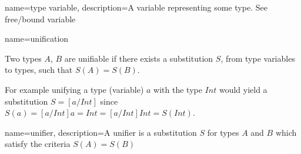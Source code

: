 { name={type variable},
  description={A variable representing some type. See free/bound variable}
}

{ name={unification} }
{Two types $A$, $B$ are unifiable if there exists a substitution $S$, from type variables to types, such that $S(A) = S(B)$.

For example unifying a type (variable) $a$ with the type $Int$ would yield a substitution $S = [a/Int]$ since $S(a) = [a/Int]a = Int = [a/Int]Int = S(Int)$.
}

{ name={unifier},
  description={A unifier is a substitution $S$ for types $A$ and $B$ which satisfy the criteria $S(A) = S(B)$}
}


